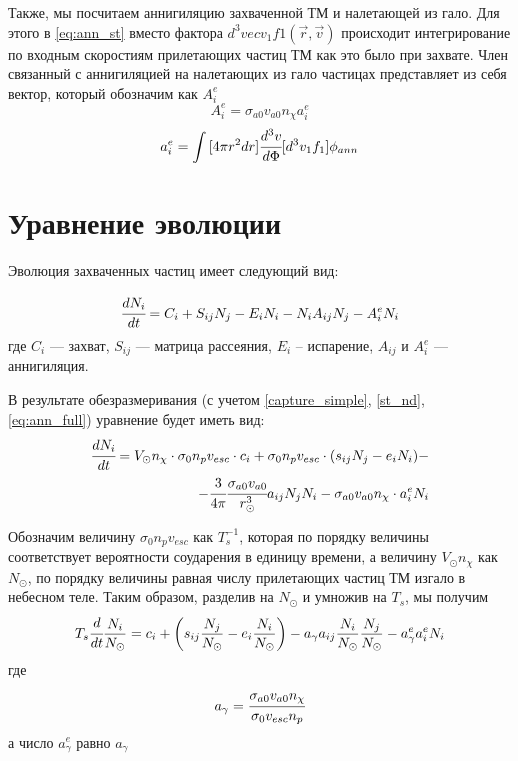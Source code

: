 Также, мы посчитаем аннигиляцию захваченной ТМ и налетающей из гало. Для этого в \ref{eq:ann_st} вместо фактора $d^3vec{v_1}f1(\vec{r},\vec{v})$ происходит интегрирование по входным скоростиям прилетающих частиц ТМ как это было при захвате. Член связанный с аннигиляцией на налетающих из гало частицах представляет из себя вектор, который обозначим как $A^e_i$
\begin{equation}
	\label{eq:ANN_full}
	A^e_{i} = \sigma_{a0} v_{a0} n_{\chi} a^e_{i}
\end{equation}
\begin{equation}
	\label{eq:ann_full}
	a^e_{i} = \int{[4\pi r^2dr] \cfrac{d^3v}{d\Phi}} [d^3v_1f_1] \phi_{ann}
\end{equation} 

\section{Уравнение эволюции}

Эволюция захваченных частиц имеет следующий вид:

\begin{equation}
	\cfrac{d N_i}{d t} = C_i + S_{ij}N_j - E_i N_i - N_i A_{ij} N_j - A^e_{i}N_i
\end{equation}
где $C_i$ --- захват,  $S_{ij}$ --- матрица рассеяния, $E_i$ -- испарение, $A_{ij}$ и $A^e_{i}$ --- аннигиляция.

В результате обезразмеривания (с учетом \ref{capture_simple}, \ref{st_nd}, \ref{eq:ann_full}) уравнение будет иметь вид:
\begin{equation*}
\begin{split}
	\cfrac{d N_i}{d t} = V_{\odot}n_{\chi} \cdot \sigma_{0} n_p v_{esc} \cdot c_{i} + \sigma_{0} n_p v_{esc} \cdot (s_{ij}N_j - e_i N_i) -\\
	-\cfrac{3}{4\pi}\cfrac{\sigma_{a0} v_{a0}}{r_{\odot}^3} a_{ij} N_j N_i-
	\sigma_{a0} v_{a0} n_{\chi} \cdot a^e_i N_i
\end{split}
\end{equation*}

Обозначим величину $\sigma_{0} n_p v_{esc}$ как $T_s^{-1}$, которая по порядку величины соответствует вероятности соударения в единицу времени, а величину $V_{\odot}n_{\chi}$ как $N_{\odot}$, по порядку величины равная числу прилетающих частиц ТМ изгало в небесном теле.
Таким образом, разделив на $N_{\odot}$ и умножив на $T_s$, мы получим
\begin{equation}
	\label{eq:evol_compt}
	T_s\cfrac{d }{d t}\frac{N_i}{N_{\odot}} = c_{i} + \left(s_{ij} \frac{N_j}{N_{\odot}} - e_i \frac{N_i}{N_{\odot}}\right) - a_{\gamma} a_{ij} \frac{N_i}{N_{\odot}} \frac{N_j}{N_{\odot}} -  a^e_{\gamma} a^e_i N_i
\end{equation}
где
\begin{equation}
	\label{eq:a_gamma}
	a_{\gamma} = \cfrac{\sigma_{a0} v_{a0} n_{\chi}}{\sigma_{0} v_{esc} n_p}
\end{equation}
а число $a^e_{\gamma}$ равно $a_{\gamma}$

